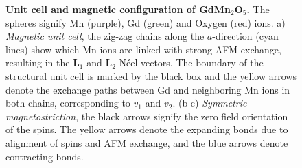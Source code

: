 \begin{figure}
	\caption{\label{fig:GdMn2O5_unit_cell}{\bf Unit cell and magnetic configuration of GdMn$_2$O$_5$.} The spheres signify Mn (purple), Gd (green) and Oxygen (red) ions. a) {\it Magnetic unit cell}, the zig-zag chains along the $a$-direction (cyan lines) show which Mn ions are linked with strong AFM exchange, resulting in the $\mathbf{L}_1$ and $\mathbf{L}_2$ N\'eel vectors. The boundary of the structural unit cell is marked by the black box and the yellow arrows denote the exchange paths between Gd and neighboring Mn ions in both chains, corresponding to $v_1$ and $v_2$. (b-c) {\it Symmetric magnetostriction}, the black arrows signify the zero field orientation of the spins. The yellow arrows denote the expanding bonds due to alignment of spins and AFM exchange, and the blue arrows denote contracting bonds.}
\end{figure}
